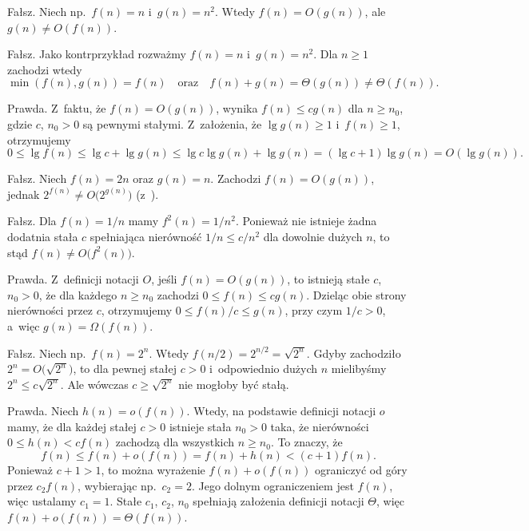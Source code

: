 
\subproblem %
Fałsz.
Niech np.\ $f(n)=n$ i~$g(n)=n^2$.
Wtedy $f(n)=O(g(n))$, ale $g(n)\ne O(f(n))$.

\subproblem %
Fałsz.
Jako kontrprzykład rozważmy $f(n)=n$ i~$g(n)=n^2$.
Dla $n\ge1$ zachodzi wtedy
\[
	\min(f(n),g(n)) = f(n) \quad\text{oraz}\quad f(n)+g(n) = \Theta(g(n)) \ne \Theta(f(n)).
\]

\subproblem %
Prawda.
Z~faktu, że $f(n)=O(g(n))$, wynika $f(n)\le cg(n)$ dla $n\ge n_0$, gdzie $c$, $n_0>0$ są pewnymi stałymi.
Z~założenia, że $\lg g(n)\ge1$ i~$f(n)\ge1$, otrzymujemy
\[
	0 \le \lg f(n) \le \lg c+\lg g(n) \le \lg c\lg g(n)+\lg g(n) = (\lg c+1)\lg g(n) = O(\lg g(n)).
\]

\subproblem %
Fałsz.
Niech $f(n)=2n$ oraz $g(n)=n$.
Zachodzi $f(n)=O(g(n))$, jednak $2^{f(n)}\ne O\bigl(2^{g(n)}\bigr)$ (z~).

\subproblem %
Fałsz.
Dla $f(n)=1/n$ mamy $f^2(n)=1/n^2$.
Ponieważ nie istnieje żadna dodatnia stała $c$ spełniająca nierówność $1/n\le c/n^2$ dla dowolnie dużych $n$, to stąd $f(n)\ne O\bigl(f^2(n)\bigr)$.

\subproblem %
Prawda.
Z~definicji notacji $O$, jeśli $f(n)=O(g(n))$, to istnieją stałe $c$, $n_0>0$, że dla każdego $n\ge n_0$ zachodzi $0\le f(n)\le cg(n)$.
Dzieląc obie strony nierówności przez $c$, otrzymujemy $0\le f(n)/c\le g(n)$, przy czym $1/c>0$, a~więc $g(n)=\Omega(f(n))$.

\subproblem %
Fałsz.
Niech np.\ $f(n)=2^n$.
Wtedy $f(n/2)=2^{n/2}=\sqrt{2^n}$.
Gdyby zachodziło $2^n=O\bigl(\!\sqrt{2^n}\bigr)$, to dla pewnej stałej $c>0$ i~odpowiednio dużych $n$ mielibyśmy $2^n\le c\sqrt{2^n}$.
Ale wówczas $c\ge\sqrt{2^n}$ nie mogłoby być stałą.

\subproblem %
Prawda.
Niech $h(n)=o(f(n))$.
Wtedy, na podstawie definicji notacji $o$ mamy, że dla każdej stałej $c>0$ istnieje stała $n_0>0$ taka, że nierówności $0\le h(n)<cf(n)$ zachodzą dla wszystkich $n\ge n_0$.
To znaczy, że
\[
	f(n) \le f(n)+o(f(n)) = f(n)+h(n) < (c+1)f(n).
\]
Ponieważ $c+1>1$, to można wyrażenie $f(n)+o(f(n))$ ograniczyć od góry przez $c_2f(n)$, wybierając np.\ $c_2=2$.
Jego dolnym ograniczeniem jest $f(n)$, więc ustalamy $c_1=1$.
Stałe $c_1$, $c_2$, $n_0$ spełniają założenia definicji notacji $\Theta$, więc $f(n)+o(f(n))=\Theta(f(n))$.
